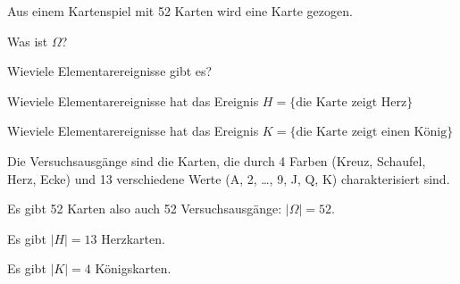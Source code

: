 Aus einem Kartenspiel mit 52 Karten wird eine Karte gezogen.
\begin{teilaufgaben}
\item Was ist $\Omega$?
\item Wieviele Elementarereignisse gibt es?
\item Wieviele Elementarereignisse hat das Ereignis
$H=\{\text{die Karte zeigt Herz}\}$
\item Wieviele Elementarereignisse hat das Ereignis
$K=\{\text{die Karte zeigt einen König}\}$
\end{teilaufgaben}

\begin{loesung}
\begin{teilaufgaben}
\item
Die Versuchsausgänge sind die Karten, die durch 4 Farben (Kreuz, Schaufel,
Herz, Ecke) und 13 verschiedene Werte (A, 2, \dots, 9, J, Q, K) charakterisiert
sind.
\item
Es gibt 52 Karten also auch 52 Versuchsausgänge: $|\Omega|=52$.
\item
Es gibt $|H|=13$ Herzkarten.
\item
Es gibt $|K|=4$ Königskarten.
\qedhere
\end{teilaufgaben}
\end{loesung}

